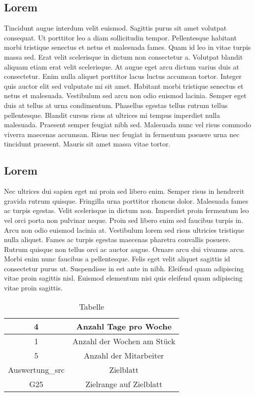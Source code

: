 \subsection{Lorem}
Tincidunt augue interdum velit euismod. Sagittis purus sit amet volutpat consequat. Ut porttitor leo a diam sollicitudin tempor. Pellentesque habitant morbi tristique senectus et netus et malesuada fames. Quam id leo in vitae turpis massa sed. Erat velit scelerisque in dictum non consectetur a. Volutpat blandit aliquam etiam erat velit scelerisque. At augue eget arcu dictum varius duis at consectetur. Enim nulla aliquet porttitor lacus luctus accumsan tortor. Integer quis auctor elit sed vulputate mi sit amet. Habitant morbi tristique senectus et netus et malesuada. Vestibulum sed arcu non odio euismod lacinia. Semper eget duis at tellus at urna condimentum. Phasellus egestas tellus rutrum tellus pellentesque. Blandit cursus risus at ultrices mi tempus imperdiet nulla malesuada. Praesent semper feugiat nibh sed. Malesuada nunc vel risus commodo viverra maecenas accumsan. Risus nec feugiat in fermentum posuere urna nec tincidunt praesent. Mauris sit amet massa vitae tortor.

\subsection{Lorem}
Nec ultrices dui sapien eget mi proin sed libero enim. Semper risus in hendrerit gravida rutrum quisque. Fringilla urna porttitor rhoncus dolor. Malesuada fames ac turpis egestas. Velit scelerisque in dictum non. Imperdiet proin fermentum leo vel orci porta non pulvinar neque. Proin sed libero enim sed faucibus turpis in. Arcu non odio euismod lacinia at. Vestibulum lorem sed risus ultricies tristique nulla aliquet. Fames ac turpis egestas maecenas pharetra convallis posuere. Rutrum quisque non tellus orci ac auctor augue. Ornare arcu dui vivamus arcu. Morbi enim nunc faucibus a pellentesque. Felis eget velit aliquet sagittis id consectetur purus ut. Suspendisse in est ante in nibh. Eleifend quam adipiscing vitae proin sagittis nisl. Euismod elementum nisi quis eleifend quam adipiscing vitae proin sagittis.
\begin{table}[h]
 \centering
 \begin{tabular}{|c|c|}\hline
   4 & Anzahl Tage pro Woche \\ \hline
   1 & Anzahl der Wochen am Stück \\ \hline
   5 & Anzahl der Mitarbeiter \\ \hline
   Auswertung\_src & Zielblatt \\ \hline
   G25 & Zielrange auf Zielblatt \\ \hline
 \end{tabular}
 \caption{Tabelle}\label{fig:tabelle}
\end{table}
\newpage
